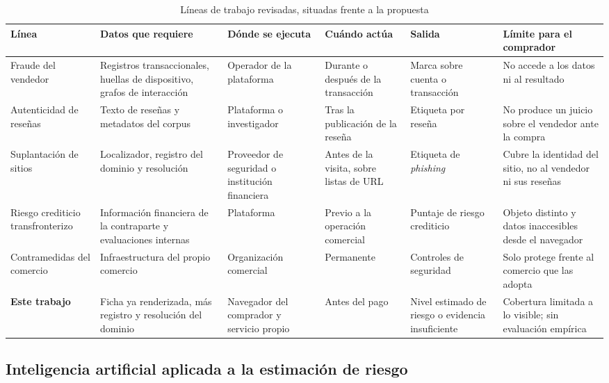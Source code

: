 \begin{table}[t]
\caption{Líneas de trabajo revisadas, situadas frente a la propuesta}
\label{tab:comparativa}
\centering
\footnotesize
\setlength{\tabcolsep}{4pt}
\renewcommand{\arraystretch}{1.15}
\begin{tabular}{@{}p{2.6cm}p{3.1cm}p{2.3cm}p{2.1cm}p{2.4cm}p{3.1cm}@{}}
\toprule
\textbf{Línea} & \textbf{Datos que requiere} & \textbf{Dónde se ejecuta} & \textbf{Cuándo actúa} & \textbf{Salida} & \textbf{Límite para el comprador} \\
\midrule
Fraude del vendedor \cite{ref10, ref13, ref14, ref28} & Registros transaccionales, huellas de dispositivo, grafos de interacción & Operador de la plataforma & Durante o después de la transacción & Marca sobre cuenta o transacción & No accede a los datos ni al resultado \\
Autenticidad de reseñas \cite{ref15, ref16, ref17, ref18} & Texto de reseñas y metadatos del corpus & Plataforma o investigador & Tras la publicación de la reseña & Etiqueta por reseña & No produce un juicio sobre el vendedor ante la compra \\
Suplantación de sitios \cite{ref7, ref25} & Localizador, registro del dominio y resolución & Proveedor de seguridad o institución financiera & Antes de la visita, sobre listas de URL & Etiqueta de \textit{phishing} & Cubre la identidad del sitio, no al vendedor ni sus reseñas \\
Riesgo crediticio transfronterizo \cite{ref32} & Información financiera de la contraparte y evaluaciones internas & Plataforma & Previo a la operación comercial & Puntaje de riesgo crediticio & Objeto distinto y datos inaccesibles desde el navegador \\
Contramedidas del comercio \cite{ref30} & Infraestructura del propio comercio & Organización comercial & Permanente & Controles de seguridad & Solo protege frente al comercio que las adopta \\
\textbf{Este trabajo} & Ficha ya renderizada, más registro y resolución del dominio & Navegador del comprador y servicio propio & Antes del pago & Nivel estimado de riesgo o evidencia insuficiente & Cobertura limitada a lo visible; sin evaluación empírica \\
\bottomrule
\end{tabular}
\end{table}

\subsection{Inteligencia artificial aplicada a la estimación de riesgo}

